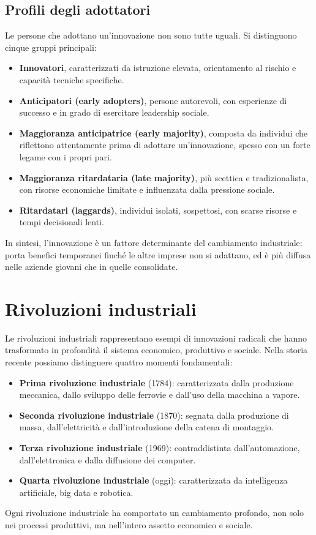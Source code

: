 \documentclass[12pt]{article}
\begin{document}
\subsection*{Profili degli adottatori}
Le persone che adottano un’innovazione non sono tutte uguali. Si distinguono cinque gruppi principali:
\begin{itemize}
    \item \textbf{Innovatori}, caratterizzati da istruzione elevata, orientamento al rischio e capacità tecniche specifiche.
    \item \textbf{Anticipatori (early adopters)}, persone autorevoli, con esperienze di successo e in grado di esercitare leadership sociale.
    \item \textbf{Maggioranza anticipatrice (early majority)}, composta da individui che riflettono attentamente prima di adottare un’innovazione, spesso con un forte legame con i propri pari.
    \item \textbf{Maggioranza ritardataria (late majority)}, più scettica e tradizionalista, con risorse economiche limitate e influenzata dalla pressione sociale.
    \item \textbf{Ritardatari (laggards)}, individui isolati, sospettosi, con scarse risorse e tempi decisionali lenti.
\end{itemize}

In sintesi, l’innovazione è un fattore determinante del cambiamento industriale: porta benefici temporanei finché le altre imprese non si adattano, ed è più diffusa nelle aziende giovani che in quelle consolidate.

\section{Rivoluzioni industriali}
Le rivoluzioni industriali rappresentano esempi di innovazioni radicali che hanno trasformato in profondità il sistema economico, produttivo e sociale.  
Nella storia recente possiamo distinguere quattro momenti fondamentali:

\begin{itemize}
    \item \textbf{Prima rivoluzione industriale} (1784): caratterizzata dalla produzione meccanica, dallo sviluppo delle ferrovie e dall’uso della macchina a vapore.
    \item \textbf{Seconda rivoluzione industriale} (1870): segnata dalla produzione di massa, dall’elettricità e dall’introduzione della catena di montaggio.
    \item \textbf{Terza rivoluzione industriale} (1969): contraddistinta dall’automazione, dall’elettronica e dalla diffusione dei computer.
    \item \textbf{Quarta rivoluzione industriale} (oggi): caratterizzata da intelligenza artificiale, big data e robotica.
\end{itemize}

Ogni rivoluzione industriale ha comportato un cambiamento profondo, non solo nei processi produttivi, ma nell’intero assetto economico e sociale.
\end{document}
